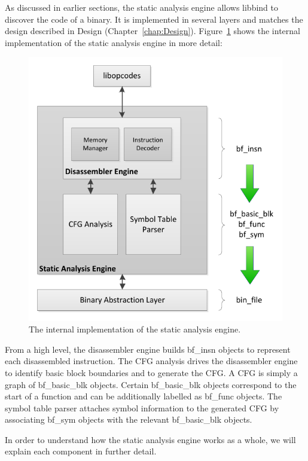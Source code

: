As discussed in earlier sections, the static analysis engine allows libbind to discover the code of a binary. It is implemented in several layers and matches the design described in Design (Chapter~\ref{chap:Design}). Figure~\ref{fig:SAE_Detail} shows the internal implementation of the static analysis engine in more detail:

\begin{figure}[H]
 \centering
 \includegraphics{Static_Analysis_Engine_Detail.pdf}
 \caption[Hierarchy]{The internal implementation of the static analysis engine.}
\label{fig:SAE_Detail}
\end{figure}

From a high level, the disassembler engine builds bf\_insn objects to represent each disassembled instruction. The CFG analysis drives the disassembler engine to identify basic block boundaries and to generate the CFG. A CFG is simply a graph of bf\_basic\_blk objects. Certain bf\_basic\_blk objects correspond to the start of a function and can be additionally labelled as bf\_func objects. The symbol table parser attaches symbol information to the generated CFG by associating bf\_sym objects with the relevant bf\_basic\_blk objects.

In order to understand how the static analysis engine works as a whole, we will explain each component in further detail.

